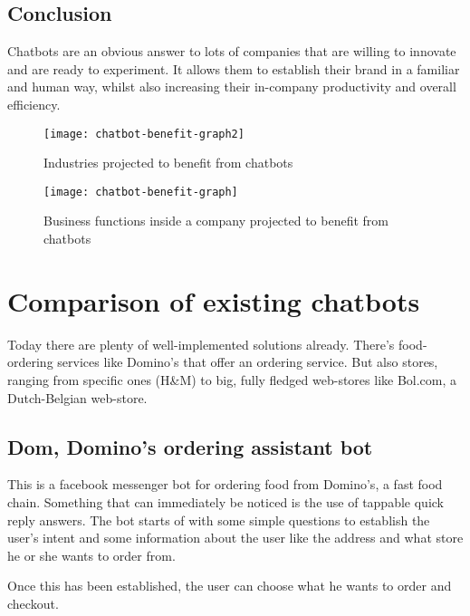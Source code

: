 \subsection{Conclusion}

Chatbots are an obvious answer to lots of companies that are willing to innovate and are ready to experiment. It allows them to establish their brand in a familiar and human way, whilst also increasing their in-company productivity and overall efficiency.

\begin{figure}[p]
	\centering
	\texttt{[image: chatbot-benefit-graph2]}\label{fig:chatbot-benefit-graph2}
	\caption{Industries projected to benefit from chatbots~\cite{chatbot-industry-benefits}}
\end{figure}

\begin{figure}[p]
	\centering
	\texttt{[image: chatbot-benefit-graph]}\label{fig:chatbot-benefit-graph}
	\caption{Business functions inside a company projected to benefit from chatbots~\cite{chatbot-industry-benefits}}
\end{figure}

\newpage

\section{Comparison of existing chatbots}

Today there are plenty of well-implemented solutions already. There's food-ordering services like Domino's that offer an ordering service. But also stores, ranging from specific ones (H\&M) to big, fully fledged web-stores like Bol.com, a Dutch-Belgian web-store.

\subsection{Dom, Domino's ordering assistant bot}

This is a facebook messenger bot for ordering food from Domino's, a fast food chain. Something that can immediately be noticed is the use of tappable quick reply answers. The bot starts of with some simple questions to establish the user's intent and some information about the user like the address and what store he or she wants to order from.

Once this has been established, the user can choose what he wants to order and checkout.

